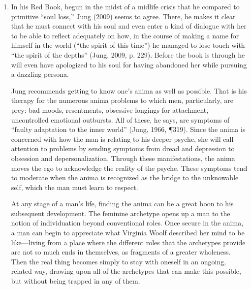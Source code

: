 \begin{enumerate}
\item {} In his Red Book, begun in the
midst of a midlife crisis that he compared to primitive “soul loss,” Jung
(2009) seems to agree. There, he makes it clear that he must connect with his
soul and even enter a kind of dialogue with her to be able to reflect
adequately on how, in the course of making a name for himself in the world
(“the spirit of this time”) he managed to lose touch with “the spirit of the
depths” (Jung, 2009, p. 229). Before the book is through he will even have
apologized to his soul for having abandoned her while pursuing a dazzling
persona.

Jung recommends getting to know one’s anima as well as possible. That is his
therapy for the numerous anima problems to which men, particularly, are prey:
bad moods, resentments, obsessive longings for attachment, uncontrolled
emotional outbursts. All of these, he says, are symptoms of “faulty adaptation
to the inner world” (Jung, 1966, ¶319). Since the anima is concerned with how
the man is relating to his deeper psyche, she will call attention to problems
by sending symptoms from dread and depression to obsession and
depersonalization. Through these manifestations, the anima moves the ego to
acknowledge the reality of the psyche. These symptoms tend to moderate when the
anima is recognized as the bridge to the unknowable self, which the man must
learn to respect.

At any stage of a man’s life, finding the anima can be a great boon to his
subsequent development. The feminine archetype opens up a man to the notion of
individuation beyond conventional roles. Once secure in the anima, a man can
begin to appreciate what Virginia Woolf described her mind to be like—living
from a place where the different roles that the archetypes provide are not so
much ends in themselves, as fragments of a greater wholeness. Then the real
thing becomes simply to stay with oneself in an ongoing, related way, drawing
upon all of the archetypes that can make this possible, but without being
trapped in any of them.

\end{enumerate}
